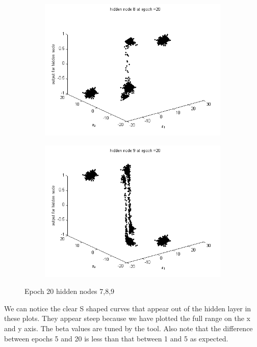 \documentclass{article}
\begin{document}
\begin{flushleft}
\begin{figure}
\begin{subfigure}{.3\textwidth}
\end{subfigure}%
\begin{subfigure}{.3\textwidth}
  \centering
  \includegraphics[width=.8\linewidth]{Classification/linearlySeparable/h20_8}
  
\end{subfigure}
\begin{subfigure}{.3\textwidth}
  \centering
  \includegraphics[width=.8\linewidth]{Classification/linearlySeparable/h20_9}
  
\end{subfigure}
\caption{Epoch 20 hidden nodes 7,8,9}
\end{figure}
We can notice the clear S shaped curves that appear out of the hidden layer in these plots. They appear steep because we have plotted the full range on the x and y axis. The beta values are tuned by the tool. Also note that the difference between epochs 5 and 20 is less than that between 1 and 5 as expected.\\[10pt]



\end{flushleft}
\end{document}
